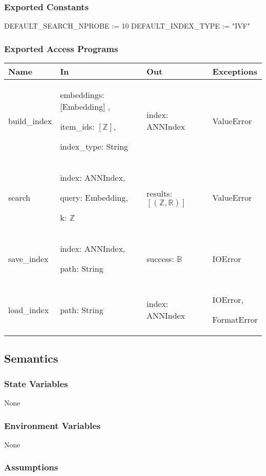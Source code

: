 \documentclass[12pt, titlepage]{article}
\begin{document}
\subsubsection{Exported Constants}
DEFAULT\_SEARCH\_NPROBE := 10
DEFAULT\_INDEX\_TYPE := "IVF"
\subsubsection{Exported Access Programs}

\begin{center}
\begin{tabular}{p{4cm} p{4cm} p{4cm} p{3cm}}
\hline
\textbf{Name} & \textbf{In} & \textbf{Out} & \textbf{Exceptions} \\
\hline
build\_index & embeddings: [Embedding] ,

item\_ids: $[\mathbb{Z}]$,

index\_type: String & index: ANNIndex & ValueError \\
\hline
search & index: ANNIndex,

query: Embedding,

k: $\mathbb{Z}$
 & results: $[(\mathbb{Z}, \mathbb{R})]$ & ValueError \\
\hline
save\_index & index: ANNIndex, 

path: String & success: $\mathbb{B}$ & IOError \\
\hline
load\_index & path: String 
 & index: ANNIndex & IOError, 
 
 FormatError \\
\hline
\end{tabular}
\end{center}

\subsection{Semantics}

\subsubsection{State Variables}
None

\subsubsection{Environment Variables}

None

\subsubsection{Assumptions}
\end{document}
